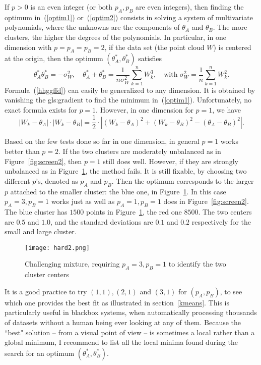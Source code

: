 \documentclass[oneside,10pt]{book}
\begin{document}
If $p>0$ is an even integer (or both $p_A,p_B$ are even integers), then finding the optimum in~(\ref{optim1}) or~(\ref{optim2}) consists in solving a system of 
 multivariate polynomials, where the 
 unknowns are the components of $\theta_A$ and $\theta_B$. The more clusters, the higher the degrees of the polynomials. In particular, in one dimension with $p=p_A=p_B=2$, if the data set (the point cloud $W$) is centered at the origin, then the optimum $(\theta_A^*,\theta_B^*)$ satisfies 
\begin{equation}
\theta_A^* \theta_B^* =-\sigma^2_W, \quad \theta_A^*+\theta_B^*=\frac{1}{n\sigma^2_W}\sum_{k=1}^n W_k^3, 
\quad \text{with } \sigma^2_W=\frac{1}{n}\sum_{k=1}^n W_k^2. \label{hhggffd}
\end{equation}
Formula~(\ref{hhggffd}) can easily be generalized to any dimension. It is obtained by vanishing the \gls{gls:gradient} to find the minimum in~(\ref{optim1}). Unfortunately, no exact formula exists for $p=1$. However, in one dimension for $p=1$, we have
$$
|W_k-\theta_A|\cdot |W_k-\theta_B| = \frac{1}{2}\cdot | (W_k-\theta_A)^2 + (W_k-\theta_B)^2-(\theta_A -\theta_B)^2 |.
$$

Based on the few tests done so far in one dimension, in general $p=1$ works better than $p=2$. If the two clusters are moderately unbalanced as in Figure~\ref{fig:screen2}, then $p=1$ still does well. 
However, if they are strongly unbalanced as in Figure~\ref{fig:hard}, the method fails.  It is still fixable, by choosing two different $p$'s,  denoted as $p_A$ and $p_B$. Then the optimum 
corresponds to the larger $p$ attached to
 the smaller cluster: the blue one, in Figure~\ref{fig:hard}.  In this case $p_A=3,p_B=1$ works just as well  as $p_A=1, p_B=1$ does
 in Figure~\ref{fig:screen2}.
The blue cluster has $1500$ points in Figure~\ref{fig:hard}, the red one $8500$. The two centers are $0.5$ and $1.0$,
   and the standard deviations are $0.1$ and $0.2$ respectively for the small and large cluster.

\begin{figure}[H]
\centering
\texttt{[image: hard2.png]}  
\caption{Challenging mixture, requiring $p_A=3,p_B=1$ to identify the two cluster centers}
\label{fig:hard}
\end{figure}


 It is a good practice to try $(1,1), (2,1)$ and $(3,1)$ for $(p_A,p_B)$, to see which one provides the best fit as illustrated
 in section~\ref{kmeans}. This is particularly useful in blackbox systems, when automatically processing thousands of datasets without a human being ever looking at any of them.  Because the 
 ``best" solution -- from a visual point of view -- is sometimes a local rather than a global minimum, I recommend to list all the local minima found during the search for an 
 optimum $(\theta_A^*,\theta_B^*)$. 
\end{document}
